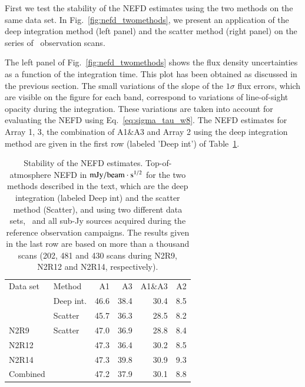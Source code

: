 First we test the stability of the NEFD estimates using the two
methods on the same data set. In Fig.~\ref{fig:nefd_twomethods}, we
present an application of the deep integration method (left panel) and
the scatter method (right panel) on
the series of \hls\ observation scans.

The left panel of Fig.~\ref{fig:nefd_twomethods} shows the flux density
uncertainties as a function of the integration time. This plot has
been obtained as discussed in the previous section. The small
variations of the slope of the $1\sigma$ flux errors, which are
visible on the figure for each band, correspond to variations of line-of-sight opacity
during the integration. These variations are taken into account for
evaluating the NEFD using Eq.~\ref{eq:sigma_tau_w8}. The NEFD estimates for Array 1, 3, the
combination of A1$\&$A3 and Array 2 using the deep  
integration method are given in the first row (labeled 'Deep int') of
Table~\ref{tab:nefd_summary}. 
 
\begin{table}[!htbp]
  \centering
  \caption[]{Stability of the NEFD estimates. Top-of-atmosphere NEFD
    in $\rm{mJy}/{beam}\cdot s^{1/2}$ for the two methods described in the text, which
  are the deep integration (labeled Deep int) and the scatter method
  (Scatter), and using two different data sets, \hls\
  and all sub-Jy sources acquired during the reference observation
  campaigns. The results given in the last row are based on more than a thousand
  scans (202, 481 and 430 scans during N2R9, N2R12 and N2R14, respectively).}
  \label{tab:nefd_summary}
  \begin{tabular}{llrrrr}
    \hline\hline
    \noalign{\smallskip}
    Data set   & Method   & A1      &   A3    &   A1\&A3 &    A2 \\
    \noalign{\smallskip}
    \hline
    \noalign{\smallskip}
    \hls &     Deep int.  &  46.6  &    38.4  &    30.4  &   8.5  \\
         &     Scatter    &  45.7  &    36.3  &    28.5  &   8.2  \\
    \hline
    \noalign{\smallskip}
    N2R9     & Scatter    & 47.0 &  36.9  & 28.8  & 8.4 \\
    N2R12    &            & 47.3 &  36.4  & 30.2  & 8.5 \\
    N2R14    &            & 47.3 &  39.8  & 30.9  & 9.3 \\
    Combined &            & 47.2 &  37.9  & 30.1  & 8.8 \\
    \hline
  \end{tabular}
\end{table}

